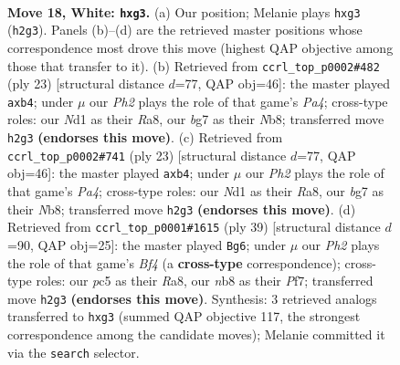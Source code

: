 \documentclass[11pt]{article}
\begin{document}
\clearpage

\begin{figure}[p]\centering
\begin{subfigure}{0.46\textwidth}\centering
\resizebox{\linewidth}{!}{%
\newchessgame
\chessboard[
  setfen={1nb2rk1/r5b1/1p2pn2/p1p2pp1/2P5/1P4p1/P2NPPBP/1RBNR1K1 w - - 0 18},
  showmover=false,
  pgfstyle=straightmove, color=movearrow, markmove={h2-g3}
]}
\caption{}
\end{subfigure}\hfill
\begin{subfigure}{0.46\textwidth}\centering
\resizebox{\linewidth}{!}{%
\newchessgame
\chessboard[
  setfen={rn2kb1r/1p3ppp/2p1p3/p3Pn2/1P3P2/7P/P1PP1BP1/RN2KB1R b KQkq - 2 12},
  showmover=false,
  pgfstyle=straightmove, color=movearrow, markmove={a5-b4}
]}
\caption{}
\end{subfigure}
\\[4pt]
\begin{subfigure}{0.46\textwidth}\centering
\resizebox{\linewidth}{!}{%
\newchessgame
\chessboard[
  setfen={rn2kb1r/1p3ppp/2p1p3/p3Pn2/1P3P2/7P/P1PP1BP1/RN2KB1R b KQkq - 2 12},
  showmover=false,
  pgfstyle=straightmove, color=movearrow, markmove={a5-b4}
]}
\caption{}
\end{subfigure}\hfill
\begin{subfigure}{0.46\textwidth}\centering
\resizebox{\linewidth}{!}{%
\newchessgame
\chessboard[
  setfen={r3r1k1/1p3p1p/2pn1p2/p3pb2/P2P2P1/5N1P/1P2PPB1/R1R3K1 b - - 0 20},
  showmover=false,
  pgfstyle=straightmove, color=movearrow, markmove={f5-g6}
]}
\caption{}
\end{subfigure}
\caption{\textbf{Move 18, White: \texttt{hxg3}.} (a) Our position; Melanie plays \texttt{hxg3} (\texttt{h2g3}). Panels (b)--(d) are the retrieved master positions whose correspondence most drove this move (highest QAP objective among those that transfer to it). (b) Retrieved from \texttt{ccrl\_top\_p0002\#482} (ply 23) [structural distance $d$=77, QAP obj=46]: the master played \texttt{axb4}; under $\mu$ our \emph{Ph2} plays the role of that game's \emph{Pa4}; cross-type roles: our \emph{N}d1 as their \emph{R}a8, our \emph{b}g7 as their \emph{N}b8; transferred move \texttt{h2g3} \textbf{(endorses this move)}. (c) Retrieved from \texttt{ccrl\_top\_p0002\#741} (ply 23) [structural distance $d$=77, QAP obj=46]: the master played \texttt{axb4}; under $\mu$ our \emph{Ph2} plays the role of that game's \emph{Pa4}; cross-type roles: our \emph{N}d1 as their \emph{R}a8, our \emph{b}g7 as their \emph{N}b8; transferred move \texttt{h2g3} \textbf{(endorses this move)}. (d) Retrieved from \texttt{ccrl\_top\_p0001\#1615} (ply 39) [structural distance $d$=90, QAP obj=25]: the master played \texttt{Bg6}; under $\mu$ our \emph{Ph2} plays the role of that game's \emph{Bf4} (a \textbf{cross-type} correspondence); cross-type roles: our \emph{p}c5 as their \emph{R}a8, our \emph{n}b8 as their \emph{P}f7; transferred move \texttt{h2g3} \textbf{(endorses this move)}. Synthesis: 3 retrieved analogs transferred to \texttt{hxg3} (summed QAP objective 117, the strongest correspondence among the candidate moves); Melanie committed it via the \texttt{search} selector.}
\label{fig:thought-m34}
\end{figure}
\end{document}
